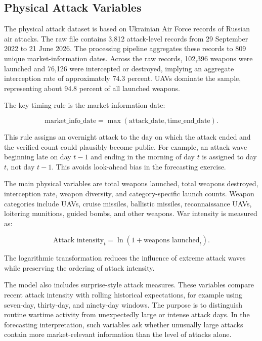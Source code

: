 \documentclass[12pt,a4paper]{article}
\begin{document}
\subsection{Physical Attack Variables}
\label{sec:attacks}

The physical attack dataset is based on Ukrainian Air Force records of Russian air attacks. The raw file contains 3,812 attack-level records from 29 September 2022 to 21 June 2026. The processing pipeline aggregates these records to 809 unique market-information dates. Across the raw records, 102,396 weapons were launched and 76,126 were intercepted or destroyed, implying an aggregate interception rate of approximately 74.3 percent. UAVs dominate the sample, representing about 94.8 percent of all launched weapons.

The key timing rule is the market-information date:

\begin{equation}
\text{market\_info\_date} =
\max(\text{attack\_date}, \text{time\_end\_date}).
\end{equation}

This rule assigns an overnight attack to the day on which the attack ended and the verified count could plausibly become public. For example, an attack wave beginning late on day $t-1$ and ending in the morning of day $t$ is assigned to day $t$, not day $t-1$. This avoids look-ahead bias in the forecasting exercise.

The main physical variables are total weapons launched, total weapons destroyed, interception rate, weapon diversity, and category-specific launch counts. Weapon categories include UAVs, cruise missiles, ballistic missiles, reconnaissance UAVs, loitering munitions, guided bombs, and other weapons. War intensity is measured as:

\begin{equation}
\text{Attack intensity}_{t} = \ln(1 + \text{weapons launched}_{t}).
\end{equation}

The logarithmic transformation reduces the influence of extreme attack waves while preserving the ordering of attack intensity.

The model also includes surprise-style attack measures. These variables compare recent attack intensity with rolling historical expectations, for example using seven-day, thirty-day, and ninety-day windows. The purpose is to distinguish routine wartime activity from unexpectedly large or intense attack days. In the forecasting interpretation, such variables ask whether unusually large attacks contain more market-relevant information than the level of attacks alone.
\end{document}
